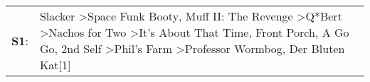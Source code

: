 \begin{supertabular}{p{0.03\textwidth}p{0.92\textwidth}}
 \textbf{S1}:  &  Slacker\textsuperscript{} \textgreater \enspace Space Funk Booty\textsuperscript{}, \enspace Muff II: The Revenge\textsuperscript{} \textgreater \enspace Q*Bert\textsuperscript{} \textgreater \enspace Nachos for Two\textsuperscript{} \textgreater \enspace It's About That Time\textsuperscript{}, \enspace Front Porch\textsuperscript{}, \enspace A Go Go\textsuperscript{}, \enspace 2nd Self\textsuperscript{} \textgreater \enspace Phil's Farm\textsuperscript{} \textgreater \enspace Professor Wormbog\textsuperscript{}, \enspace Der Bluten Kat[1]\textsuperscript{}  \enspace  \\
\end{supertabular}
